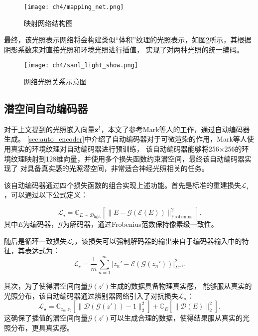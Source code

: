 \begin{figure}[htb]
  \centering
  \texttt{[image: ch4/mapping\_net.png]}
  \caption{映射网络结构图}
  \label{fig:nl_main_cn}
\end{figure}

最终，该光照表示网络将会构建类似“体积”纹理的光照表示，如图\ref{fig:nl_light_volume}所示，其根据阴影系数来对直接光照和环境光照进行插值，
实现了对两种光照的统一编码。

\begin{figure}[htb]
  \centering
  \texttt{[image: ch4/sanl\_light\_show.png]}
  \caption{网络光照关系示意图}
  \label{fig:nl_light_volume}
\end{figure}

\subsection{潜空间自动编码器}

对于上文提到的光照嵌入向量${\bf{z}}^l$，本文了参考Mark等人\cite{boss2021neural}的工作，通过自动编码器生成。
\ref{sec:auto_encoder}中介绍了自动编码器对于可微渲染的作用，Mark等人使用真实的环境纹理对自动编码器进行预训练，
该自动编码器能够将256$\times$256的环境纹理映射到128维向量，并使用多个损失函数约束潜空间，最终该自动编码器实现了
对具备真实感的光照潜空间，非常适合神经光照相关的任务。

该自动编码器通过四个损失函数的组合实现上述功能。首先是标准的重建损失$\mathcal{L}_{\mathcal{r}}$，可以通过以下公式定义：

\begin{equation}
  \label{eq:reconstruction_loss}
  \mathcal{L}_{\mathcal{r}}=\mathbb{C}_{E\sim\mathcal{D}_{\mathrm{light}}}\left[\|E-\mathcal{G}\left(\mathcal{E}(E)\right)\|_{\mathrm{Frobenius}}^2\right].
  \end{equation}
  其中$E$为编码器，$\mathcal{G}$为解码器，通过Frobenius范数保持像素级一致性。
  
  随后是循环一致损失$\mathcal{L}_{\mathcal{c}}$，该损失可以强制解码器的输出来自于编码器输入中的特征，其表达式为：
  \begin{equation}
  \label{eq:cycle_loss}
  \mathcal{L}_{\mathcal{c}}=\frac{1}{m}\sum_{n=1}^{m}\left|z_n'-\mathcal{E}\left(\mathcal{G}\left(z_n'\right)\right)\right|_{\Sigma^{-1}}^2.
  \end{equation}
  
  其次，为了使得潜空间向量$\mathcal{G}\left(z'\right)$生成的数据具备物理真实感，
  能够服从真实的光照分布，该自动编码器通过辨别器网络引入了对抗损失$\mathcal{L}_{\mathcal{a}}$：
  \begin{equation}
  \label{eq:adversarial_loss}
  \mathcal{L}_{\mathcal{a}}=\mathbb{C}_{z_a,z_b}\left[\|\mathcal{D}\left(\mathcal{G}\left(z'\right)\right)-1\|_2^2\right]+\mathbb{C}_E\left[\|\mathcal{D}\left(E\right)\|_2^2\right].
  \end{equation}
  这确保了插值的潜空间向量$\mathcal{G}\left(z'\right)$可以生成合理的数据，使得结果服从真实的光照分布，更具真实感。
  
